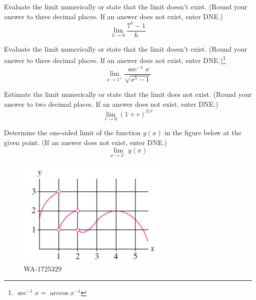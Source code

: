 \documentclass[12pt,addpoints, answers, fleqn]{exam}
\begin{document}
\begin{teacher}
\begin{questions}
\question 	%

Evaluate the limit numerically or state that the limit doesn't exist. (Round your answer to three decimal places. If an answer does not exist, enter DNE.)
\[
\lim_{h\to 0} \frac{7^h-1}{h}
\]
\begin{solution}
\end{solution}

\question 	%

Evaluate the limit numerically or state that the limit doesn't exist. (Round your answer to three decimal places. If an answer does not exist, enter DNE.)\footnote{$\sec^{-1} x = \arccos x^{-1}$}
\[
\lim_{x\to 1^+} \frac{\sec^{-1} x}{\sqrt{x^5-1}}
\]
\begin{solution}
\end{solution}

\question 	%

Estimate the limit numerically or state that the limit does not exist. (Round your answer to two decimal places. If an answer does not exist, enter DNE.)
\[
\lim_{r\to 0} \left( 1 + r \right)^{3/r}
\]
\begin{solution}
\end{solution}


\question 	%

Determine the one-sided limit of the function $y\left(x\right)$ in the figure below at the given point. (If an answer does not exist, enter DNE.)
\[
\lim_{x \to 4^-} y\left(x\right)
\]
\begin{figure}[htbp] %
   \centering
   \includegraphics[width=3in]{./graphics/1725329.pdf} 
   \caption{WA-1725329}
   \label{fig:1725329}
\end{figure}
\begin{solution}
\end{solution}

\question 	%


\end{questions}
\end{teacher}
\end{document}
